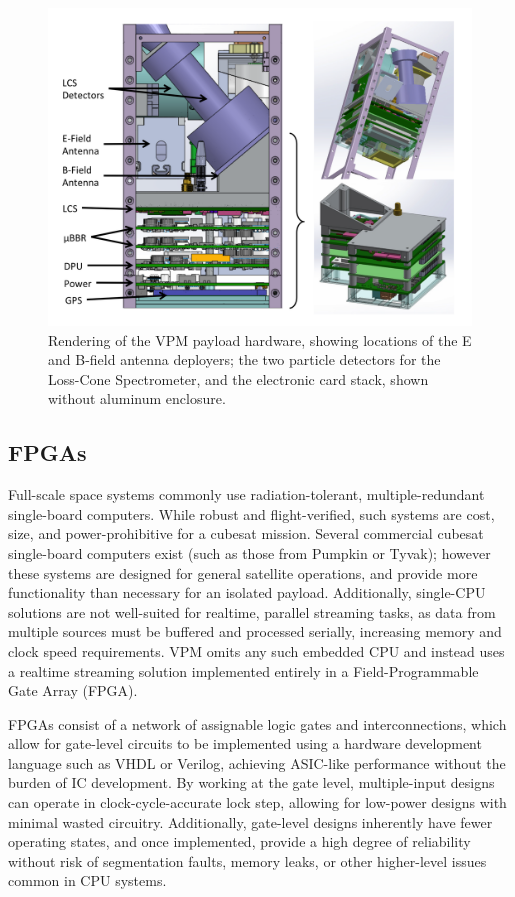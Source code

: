 \begin{figure}[htbp]
\begin{center}
\includegraphics[width=32pc]{figures/vpm_figures/payload_figure.png}
\caption[VPM payload hardware instrument arrangement]{Rendering of the VPM payload hardware, showing locations of the E and B-field antenna deployers; the two particle detectors for the Loss-Cone Spectrometer, and the electronic card stack, shown without aluminum enclosure.}
\label{fig:hardware_stack}
\end{center}
\end{figure}


\subsection{FPGAs}
Full-scale space systems commonly use radiation-tolerant, multiple-redundant single-board computers. While robust and flight-verified, such systems are cost, size, and power-prohibitive for a cubesat mission. Several commercial cubesat single-board computers exist (such as those from Pumpkin or Tyvak); however these systems are designed for general satellite operations, and provide more functionality than necessary for an isolated payload. Additionally, single-CPU solutions are not well-suited for realtime, parallel streaming tasks, as data from multiple sources must be buffered and processed serially, increasing memory and clock speed requirements. VPM omits any such embedded CPU and instead uses a realtime streaming solution implemented entirely in a Field-Programmable Gate Array (FPGA). 

FPGAs consist of a network of assignable logic gates and interconnections, which allow for gate-level circuits to be implemented using a hardware development language such as VHDL or Verilog, achieving ASIC-like performance without the burden of IC development. By working at the gate level, multiple-input designs can operate in clock-cycle-accurate lock step, allowing for low-power designs with minimal wasted circuitry. Additionally, gate-level designs inherently have fewer operating states, and once implemented, provide a high degree of reliability without risk of segmentation faults, memory leaks, or other higher-level issues common in CPU systems.

